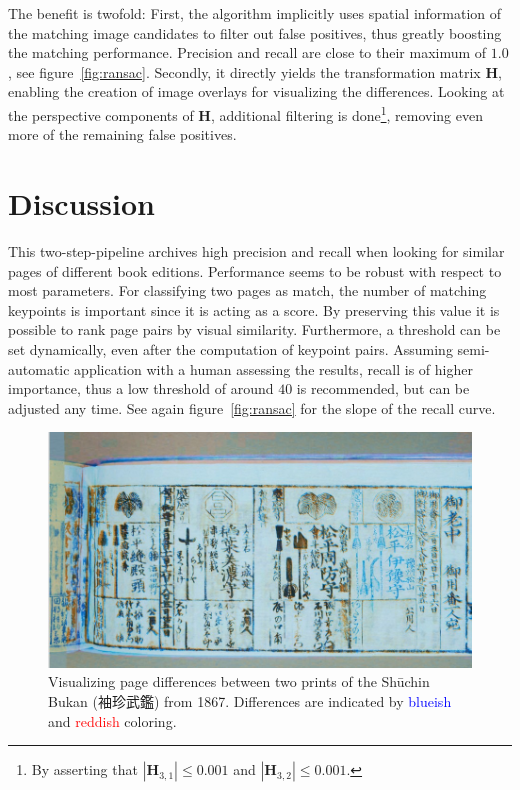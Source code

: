 \documentclass{ltjarticle}
\begin{document}
The benefit is twofold: First, the algorithm implicitly uses spatial information of the matching image candidates to filter out false positives, thus greatly boosting the matching performance. Precision and recall are close to their maximum of $1.0$, see figure~\ref{fig:ransac}. Secondly, it directly yields the transformation matrix $\mathbf{H}$, enabling the creation of image overlays for visualizing the differences. Looking at the perspective components of $\mathbf{H}$, additional filtering is done\footnote{By asserting that $|\mathbf{H}_{3,1}| \leq 0.001$ and $|\mathbf{H}_{3,2}| \leq 0.001$.}, removing even more of the remaining false positives.

\section{Discussion}

This two-step-pipeline archives high precision and recall when looking for similar pages of different book editions. Performance seems to be robust with respect to most parameters. For classifying two pages as match, the number of matching keypoints is important since it is acting as a score. By preserving this value it is possible to rank page pairs by visual similarity. Furthermore, a threshold can be set dynamically, even after the computation of keypoint pairs. Assuming semi-automatic application with a human assessing the results, recall is of higher importance, thus a low threshold of around $40$ is recommended, but can be adjusted any time. See again figure~\ref{fig:ransac} for the slope of the recall curve.

\begin{figure}
    \centering
    \includegraphics[width=\textwidth]{200019646_00006}
    \caption[Visualizing page differences]{Visualizing page differences between two prints of the Shūchin Bukan (袖珍武鑑) from 1867. Differences are indicated by \textcolor{blue}{blueish} and \textcolor{red}{reddish} coloring.}
    \label{fig:page-compare}
\end{figure}
\end{document}
